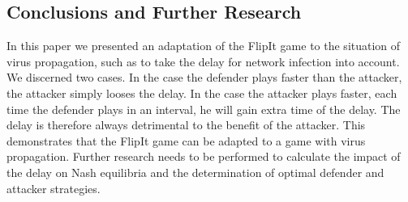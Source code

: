 \documentclass[master=cws, masteroption=vs,english]{kulemt}
\begin{document}
\begin{abstract*}
\section{Conclusions and Further Research}
\label{ch:conclusion}
In this paper we presented an adaptation of the FlipIt game to the situation of virus propagation, such as to take the delay for network infection into account. We discerned two cases. In the case the defender plays faster than the attacker, the attacker simply looses the delay. In the case the attacker plays faster, each time the defender plays in an interval, he will gain extra time of the delay. The delay is therefore always detrimental to the benefit of the attacker. 
This demonstrates that the FlipIt game can be adapted to a game with virus propagation. Further research needs to be performed to calculate the impact of the delay on Nash equilibria and the determination of optimal defender and attacker strategies.
%  
\end{abstract*}

\listoffiguresandtables
\end{document}
